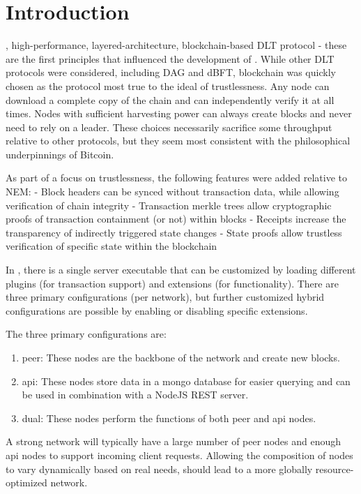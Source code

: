 \section{Introduction}
\label{sec:introduction}


, high-performance, layered-architecture, blockchain-based DLT protocol - these are the first principles that influenced the development of \codename.
While other DLT protocols were considered, including DAG and dBFT, blockchain was quickly chosen as the protocol most true to the ideal of trustlessness.
Any node can download a complete copy of the chain and can independently verify it at all times.
Nodes with sufficient harvesting power can always create blocks and never need to rely on a leader.
These choices necessarily sacrifice some throughput relative to other protocols, but they seem most consistent with the philosophical underpinnings of Bitcoin.

As part of a focus on trustlessness, the following features were added relative to NEM:
- Block headers can be synced without transaction data, while allowing verification of chain integrity
- Transaction merkle trees allow cryptographic proofs of transaction containment (or not) within blocks
- Receipts increase the transparency of indirectly triggered state changes
- State proofs allow trustless verification of specific state within the blockchain

In \codename, there is a single server executable that can be customized by loading different plugins (for transaction support) and extensions (for functionality).
There are three primary configurations (per network), but further customized hybrid configurations are possible by enabling or disabling specific extensions.

The three primary configurations are:
\begin{enumerate}
\item peer: These nodes are the backbone of the network and create new blocks.
\item api: These nodes store data in a mongo database for easier querying and can be used in combination with a NodeJS REST server.
\item dual: These nodes perform the functions of both peer and api nodes.
\end{enumerate}

A strong network will typically have a large number of peer nodes and enough api nodes to support incoming client requests.
Allowing the composition of nodes to vary dynamically based on real needs, should lead to a more globally resource-optimized network.

